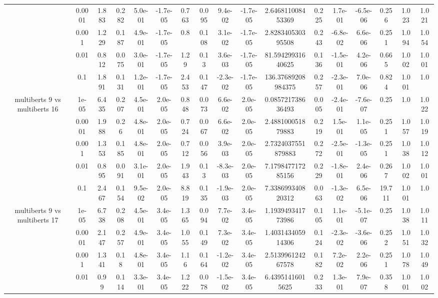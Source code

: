 \begin{tabular}{|c|c|c|c|c|c|c|c|c|c|c|c|c|c|c|c|c|}
 & 0.0001 & 1.883 & 0.282 & 5.0e-01 & -1.7e-05 & 0.763 & 0.095 & 9.4e-02 & -1.7e-05 & 2.646811008453369 & 0.225 & 1.7e-01 & -6.5e-06 & 0.256 & 1.023 & 1.021 \\
 & 0.001 & 1.229 & 0.187 & 4.9e-01 & -1.7e-05 & 0.8 & 0.108 & 3.1e-02 & -1.7e-05 & 2.828340530395508 & 0.243 & -6.8e-02 & 6.6e-06 & 0.251 & 1.094 & 1.054 \\
 & 0.01 & 0.812 & 0.075 & 3.0e-01 & -1.7e-05 & 1.29 & 0.13 & 3.6e-03 & -1.7e-05 & 81.59429931640625 & 0.136 & -1.5e-01 & 4.2e-06 & 0.665 & 1.002 & 1.001 \\
 & 0.1 & 1.891 & 0.131 & 1.2e-01 & -1.7e-05 & 2.453 & 0.147 & -2.3e-02 & -1.7e-05 & 136.37689208984375 & 0.257 & -2.3e-01 & 7.0e-06 & 0.824 & 1.001 & 1.0 \\
\hline
\multirow{5}{*}{multiberts 9 vs multiberts 16} & 1e-05 & 6.435 & 0.207 & 4.5e-01 & 2.0e-05 & 0.848 & 0.073 & 6.6e-02 & 2.0e-05 & 0.085721738636493 & 0.005 & -2.4e-01 & -7.6e-07 & 0.25 & 1.0 & 1.022 \\
 & 0.0001 & 1.988 & 0.26 & 4.8e-01 & 2.0e-05 & 0.724 & 0.067 & 6.6e-02 & 2.0e-05 & 2.488100051879883 & 0.219 & 1.5e-01 & 1.1e-05 & 0.251 & 1.057 & 1.019 \\
 & 0.001 & 1.353 & 0.185 & 4.8e-01 & 2.0e-05 & 0.712 & 0.056 & 3.9e-03 & 2.0e-05 & 2.7324037551879883 & 0.272 & -2.5e-01 & -1.3e-05 & 0.251 & 1.038 & 1.012 \\
 & 0.01 & 0.895 & 0.091 & 3.1e-01 & 2.0e-05 & 1.943 & 0.13 & -8.3e-03 & 2.0e-05 & 7.179847717285156 & 0.229 & -1.8e-01 & 2.4e-06 & 0.267 & 1.002 & 1.001 \\
 & 0.1 & 2.467 & 0.154 & 9.5e-02 & 2.0e-05 & 8.819 & 0.135 & -1.9e-03 & 2.0e-05 & 7.338699340820312 & 0.063 & -1.3e-02 & 6.5e-06 & 19.711 & 1.001 & 1.0 \\
\hline
\multirow{5}{*}{multiberts 9 vs multiberts 17} & 1e-05 & 6.738 & 0.208 & 4.5e-01 & 3.4e-05 & 1.365 & 0.094 & 7.7e-02 & 3.4e-05 & 1.193949341773986 & 0.105 & 1.1e-01 & -5.1e-07 & 0.25 & 1.038 & 1.011 \\
 & 0.0001 & 2.147 & 0.257 & 4.9e-01 & 3.4e-05 & 1.055 & 0.149 & 7.3e-02 & 3.4e-05 & 1.403143405914306 & 0.124 & -2.3e-02 & -3.6e-06 & 0.252 & 1.051 & 1.032 \\
 & 0.001 & 1.341 & 0.18 & 4.8e-01 & 3.4e-05 & 1.16 & 0.164 & -1.2e-02 & 3.4e-05 & 2.513996124267578 & 0.182 & 7.2e-02 & 2.2e-06 & 0.251 & 1.078 & 1.049 \\
 & 0.01 & 0.99 & 0.114 & 3.3e-01 & 3.4e-05 & 1.222 & 0.078 & -1.5e-02 & 3.4e-05 & 6.43951416015625 & 0.233 & 1.3e-01 & 7.9e-07 & 0.358 & 1.001 & 1.002 \\

\end{tabular}
